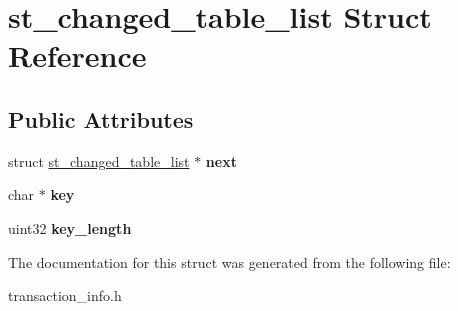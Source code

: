 \hypertarget{structst__changed__table__list}{}\section{st\+\_\+changed\+\_\+table\+\_\+list Struct Reference}
\label{structst__changed__table__list}
\subsection*{Public Attributes}
\begin{DoxyCompactItemize}
\item 
\mbox{\label{structst__changed__table__list_aa22305ce3da2431c63052cc087df1d65}} 
struct \mbox{\hyperlink{structst__changed__table__list}{st\+\_\+changed\+\_\+table\+\_\+list}} $\ast$ {\bfseries next}
\item 
\mbox{\label{structst__changed__table__list_a95d9bd16273674d352e111f4916f37e3}} 
char $\ast$ {\bfseries key}
\item 
\mbox{\label{structst__changed__table__list_aac945ad04624356c30caed7ffe79f14f}} 
uint32 {\bfseries key\+\_\+length}
\end{DoxyCompactItemize}


The documentation for this struct was generated from the following file\+:\begin{DoxyCompactItemize}
\item 
transaction\+\_\+info.\+h\end{DoxyCompactItemize}
